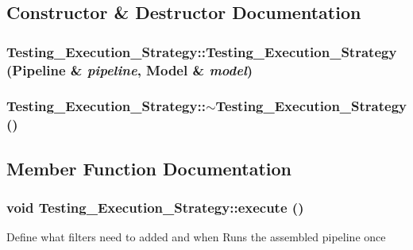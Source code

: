 \subsection{Constructor \& Destructor Documentation}
\hypertarget{class_testing___execution___strategy_a4955f2085d61c8a6154dcc5529129639}{
\subsubsection[{Testing\_\-Execution\_\-Strategy}]{\setlength{\rightskip}{0pt plus 5cm}Testing\_\-Execution\_\-Strategy::Testing\_\-Execution\_\-Strategy ({\bf Pipeline} \& {\em pipeline}, \/  {\bf Model} \& {\em model})}}
\label{class_testing___execution___strategy_a4955f2085d61c8a6154dcc5529129639}
\hypertarget{class_testing___execution___strategy_a83b0f026e891e3127d44d6c834c088b8}{
\subsubsection[{$\sim$Testing\_\-Execution\_\-Strategy}]{\setlength{\rightskip}{0pt plus 5cm}Testing\_\-Execution\_\-Strategy::$\sim$Testing\_\-Execution\_\-Strategy ()}}
\label{class_testing___execution___strategy_a83b0f026e891e3127d44d6c834c088b8}


\subsection{Member Function Documentation}
\hypertarget{class_testing___execution___strategy_ab3d6335e164af39d38409a0bceee57c8}{
\subsubsection[{execute}]{\setlength{\rightskip}{0pt plus 5cm}void Testing\_\-Execution\_\-Strategy::execute ()}}
\label{class_testing___execution___strategy_ab3d6335e164af39d38409a0bceee57c8}
Define what filters need to added and when Runs the assembled pipeline once 

